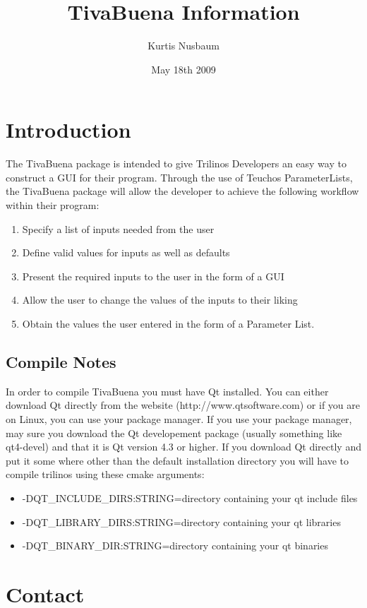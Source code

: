 \documentclass{article}
\title{TivaBuena Information}
\author{Kurtis Nusbaum}
\date{May 18th 2009}
\begin{document}
\maketitle

\section{Introduction}
The TivaBuena package is intended to give Trilinos Developers an easy way to construct a GUI for their program. Through the use of Teuchos ParameterLists,
the TivaBuena package will allow the developer to achieve the following workflow within their program:
	\begin{enumerate}
	\item Specify a list of inputs needed from the user
	\item Define valid values for inputs as well as defaults
	\item Present the required inputs to the user in the form of a GUI
	\item Allow the user to change the values of the inputs to their liking
	\item Obtain the values the user entered in the form of a Parameter List.
	\end{enumerate}

\subsection{Compile Notes}
In order to compile TivaBuena you must have Qt installed. You can either download Qt directly from the website (http://www.qtsoftware.com) or if you are on Linux, you can use your package manager.
If you use your package manager, may sure you download the Qt developement package (usually something like qt4-devel) and that it is Qt version 4.3 or higher. If you download Qt directly and put it some where other than the default
	installation directory you will have to compile trilinos using these cmake arguments:
	\begin{itemize}
	\item -DQT\_INCLUDE\_DIRS:STRING=directory containing your qt include files
	\item -DQT\_LIBRARY\_DIRS:STRING=directory containing your qt libraries
	\item -DQT\_BINARY\_DIR:STRING=directory containing your qt binaries
	\end{itemize}	

\section{Contact}
\end{document}

